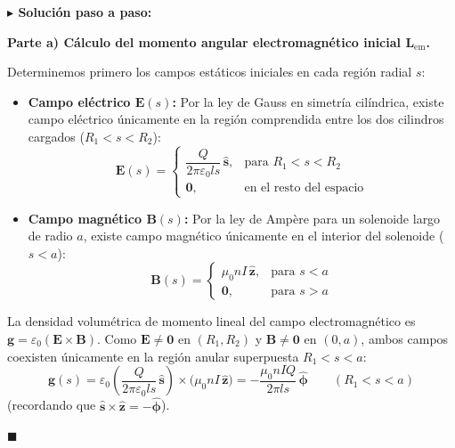 \documentclass[11pt,a4paper]{book}
\newenvironment{solucion}{%
    \par\medskip\noindent\textbf{\color{blue!65!black}\Large $\blacktriangleright$ Solución paso a paso:}\par\medskip
}{%
    \hfill$\blacksquare$\par\bigskip
}
\newcommand{\phihat}{\hat{\bm{\phi}}}
\newcommand{\shat}{\hat{\bm{s}}}
\newcommand{\zhat}{\hat{\bm{z}}}
\newcommand{\Evec}{\bm{E}}
\newcommand{\Bvec}{\bm{B}}
\begin{document}
\begin{solucion}
\textbf{Parte a) Cálculo del momento angular electromagnético inicial $\bm{L}_{\text{em}}$.}

Determinemos primero los campos estáticos iniciales en cada región radial $s$:
\begin{itemize}
    \item \textbf{Campo eléctrico $\Evec(s)$:} Por la ley de Gauss en simetría cilíndrica, existe campo eléctrico únicamente en la región comprendida entre los dos cilindros cargados ($R_1 < s < R_2$):
    \begin{equation}
        \Evec(s) = \begin{cases}
            \dfrac{Q}{2\pi\varepsilon_0 l s}\,\shat, & \text{para } R_1 < s < R_2 \\[8pt]
            \bm{0}, & \text{en el resto del espacio}
        \end{cases}
    \end{equation}
    \item \textbf{Campo magnético $\Bvec(s)$:} Por la ley de Ampère para un solenoide largo de radio $a$, existe campo magnético únicamente en el interior del solenoide ($s < a$):
    \begin{equation}
        \Bvec(s) = \begin{cases}
            \mu_0 n I\,\zhat, & \text{para } s < a \\[4pt]
            \bm{0}, & \text{para } s > a
        \end{cases}
    \end{equation}
\end{itemize}

La densidad volumétrica de momento lineal del campo electromagnético es $\bm{g} = \varepsilon_0 (\Evec \times \Bvec)$. Como $\Evec \neq \bm{0}$ en $(R_1, R_2)$ y $\Bvec \neq \bm{0}$ en $(0, a)$, ambos campos coexisten únicamente en la región anular superpuesta $R_1 < s < a$:
\begin{equation}
    \bm{g}(s) = \varepsilon_0 \left(\frac{Q}{2\pi\varepsilon_0 l s}\,\shat\right) \times \big(\mu_0 n I\,\zhat\big) = -\frac{\mu_0 n I Q}{2\pi l s}\,\phihat \qquad (R_1 < s < a)
\end{equation}
(recordando que $\shat \times \zhat = -\phihat$).


\end{solucion}
\end{document}
